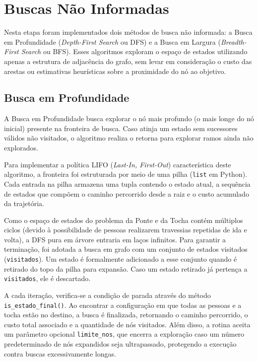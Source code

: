 \section{Buscas Não Informadas}
\label{sec:busca-nao-informada}

Nesta etapa foram implementados dois métodos de busca não informada:
a Busca em Profundidade (\textit{Depth-First Search} ou DFS) e a Busca
em Largura (\textit{Breadth-First Search} ou BFS). Esses algoritmos exploram o
espaço de estados utilizando apenas a estrutura de adjacência do
grafo, sem levar em consideração o custo das arestas ou estimativas
heurísticas sobre a proximidade do nó ao objetivo.

\subsection{Busca em Profundidade}
\label{subsec:dfs}

A Busca em Profundidade busca explorar o nó mais profundo (o mais longe do nó inicial)
presente na fronteira de busca. Caso atinja um estado sem sucessores válidos não visitados, o
algoritmo realiza o retorna para explorar ramos ainda não explorados.

Para implementar a política LIFO (\textit{Last-In, First-Out}) característica deste
algoritmo, a fronteira foi estruturada por meio de uma pilha (\texttt{list} em Python).
Cada entrada na pilha armazena uma tupla contendo o estado atual, a sequência de estados
que compõem o caminho percorrido desde a raiz e o custo acumulado da trajetória.

Como o espaço de estados do problema da Ponte e da Tocha contém múltiplos ciclos
(devido à possibilidade de pessoas realizarem travessias repetidas de ida e volta),
a DFS pura em árvore entraria em laços infinitos. Para garantir a terminação, foi
adotada a busca em grafo com um conjunto de estados visitados (\texttt{visitados}).
Um estado é formalmente adicionado a esse conjunto quando é retirado do topo da pilha
para expansão. Caso um estado retirado já pertença a \texttt{visitados}, ele é descartado.

A cada iteração, verifica-se a condição de parada através do método
\texttt{is\_estado\_final()}. Ao encontrar a configuração em que todas as pessoas e a
tocha estão no destino, a busca é finalizada, retornando o
caminho percorrido, o custo total associado e a quantidade de nós visitados. Além disso,
a rotina aceita um parâmetro opcional \texttt{limite\_nos}, que encerra a exploração
caso um número predeterminado de nós expandidos seja ultrapassado, protegendo a execução
contra buscas excessivamente longas.

